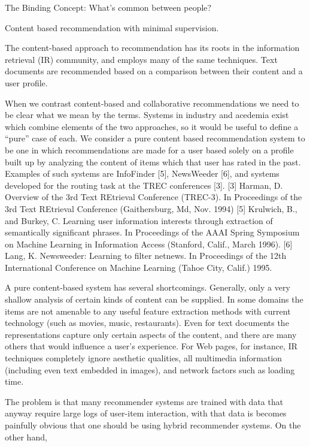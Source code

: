 \documentclass[14pt]{article}
\begin{document}
The Binding Concept: What's common between people?

Content based recommendation with minimal supervision.

The content-based approach to recommendation
has its roots in the information retrieval (IR) community,
and employs many of the same techniques.
Text documents are recommended based on a comparison
between their content and a user profile.


When we contrast content-based and collaborative recommendations we need to be
clear what we mean by the terms. Systems in industry and acedemia exist which
combine elements of the two approaches, so it would be useful to define a
``pure'' case of each. We consider a pure content based recommendation system to
be one in which recommendations are made for a user based solely on a profile
built up by analyzing the content of items which that user has rated in the
past.
 Examples of such systems are InfoFinder [5],
NewsWeeder [6], and systems developed for the routing
task at the TREC conferences [3].
[3] Harman, D. Overview of the 3rd Text REtrieval Conference (TREC-3). In
Proceedings of the 3rd Text REtrieval Conference (Gaithersburg, Md, Nov. 1994)
[5] Krulwich, B., and Burkey, C. Learning user information interests through
extraction of semantically significant phrases. In Proceedings of the AAAI
Spring Symposium on Machine Learning in Information Access (Stanford, Calif.,
March 1996).
[6] Lang, K. Newsweeder: Learning to filter netnews. In Proceedings of the 12th
International Conference on Machine Learning (Tahoe City, Calif.) 1995.

A pure content-based system has several shortcomings.
Generally, only a very shallow analysis of
certain kinds of content can be supplied. In some
domains the items are not amenable to any useful
feature extraction methods with current technology
(such as movies, music, restaurants). Even for text
documents the representations capture only certain
aspects of the content, and there are many others that
would influence a user’s experience. For Web pages,
for instance, IR techniques completely ignore aesthetic
qualities, all multimedia information (including
even text embedded in images), and network
factors such as loading time.

The problem is that many recommender systems are trained with data that anyway
require large logs of user-item interaction, with that data is becomes painfully
obvious that one should be using hybrid recommender systems. On the other hand,
\end{document}
